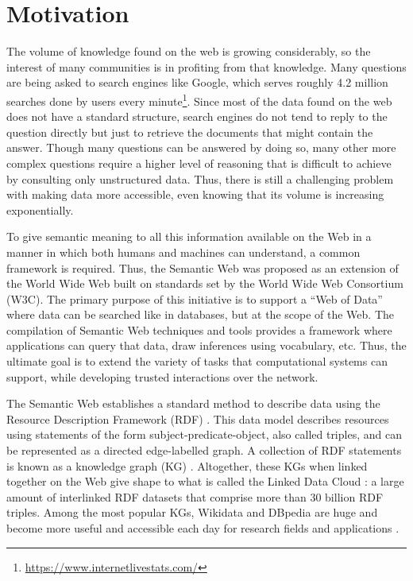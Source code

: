 \section*{Motivation}
The volume of knowledge found on the web is growing considerably, so the interest of many 
communities is in profiting from that knowledge. Many questions are being asked  
to search engines like Google, which serves roughly 4.2 million searches done by users every 
minute\footnote{\href{https://www.internetlivestats.com/}{https://www.internetlivestats.com/}}. 
Since most of the data found on the web does not have a standard structure, 
search engines do not tend to reply to the question directly but just to retrieve the documents 
that might contain the answer. Though many questions can be answered by doing so, many 
other more complex questions require a higher level of reasoning that is difficult to achieve 
by consulting only unstructured data. Thus, there is still a challenging problem with making 
data more accessible, even knowing that its volume is increasing exponentially.

To give semantic meaning to all this information available on the Web in a manner in which both 
humans and machines can understand, a common framework is required. Thus, 
the Semantic Web \cite{key:semwebsa} was proposed as an extension of the World Wide Web built on 
standards set by the World Wide Web Consortium (W3C). The primary purpose of this 
initiative is to support a “Web of Data” where data can be searched like in databases, but 
at the scope of the Web. The compilation of Semantic Web techniques and tools provides 
a framework where applications can query that data, draw inferences using vocabulary, etc. 
Thus, the ultimate goal is to extend the variety of tasks that computational systems can 
support, while developing trusted interactions over the network. 

The Semantic Web establishes a standard method to describe data using the Resource 
Description Framework (RDF) \cite{key:rdfprimer11}. This data model describes resources using statements 
of the form subject-predicate-object, also called triples, and can be represented as a directed 
edge-labelled graph. A collection of RDF statements is known as a knowledge graph (KG) \cite{key:ldbook}. 
Altogether, these KGs when linked together on the Web give shape to what is called 
the Linked Data Cloud \cite{key:ldprinciples}: a large amount of interlinked RDF datasets that comprise more 
than 30 billion RDF triples. Among the most popular KGs, Wikidata \cite{KG:wikidata} and DBpedia \cite{KG:dbpedia} 
are huge and become more useful and accessible each day for research fields and applications \cite{wikidata:usage-MalyshevKGGB18, EL:dbpedia-spotlight-MendesJGB11}. 

